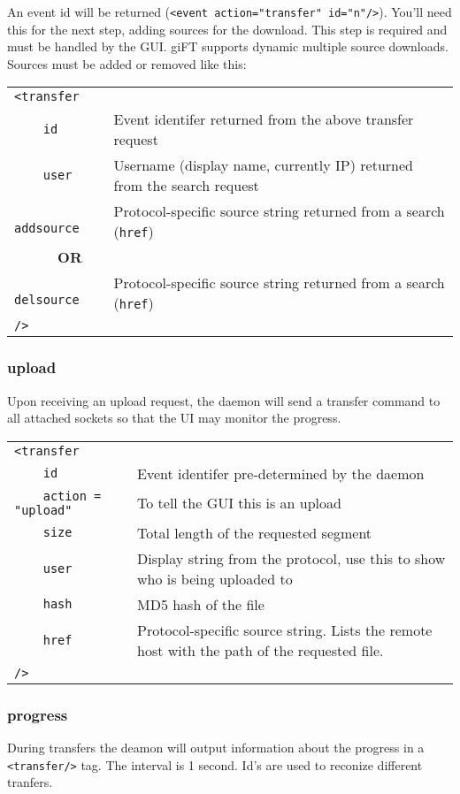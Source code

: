 \documentclass[10pt]{article}
\begin{document}
An event id will be returned (\verb|<event action="transfer" id="n"/>|). You'll
need this for the next step, adding sources for the download. This step is
required and must be handled by the GUI. giFT supports dynamic multiple source
downloads. Sources must be added or removed like this:

\begin{tabular}{p{2.6cm}p{8.5cm}}
\verb|<transfer|        &  \\
\verb|    id|           & Event identifer returned from the above transfer request \\
\verb|    user|         & Username (display name, currently IP) returned from the search request \\
\verb|    addsource|    & Protocol-specific source string returned from a search (\verb|href|) \\
\verb|      |\textbf{OR}  & \\
\verb|    delsource|    & Protocol-specific source string returned from a search (\verb|href|) \\
\verb|/>|               &
\end{tabular}

\subsubsection{upload}
Upon receiving an upload request, the daemon will send a transfer command to
all attached sockets so that the UI may monitor the progress.

\begin{tabular}{p{3.9cm}p{7.2cm}}
\verb|<transfer|    &  \\
\verb|    id|       & Event identifer pre-determined by the daemon \\
\verb|    action = "upload"| & To tell the GUI this is an upload \\
\verb|    size|     & Total length of the requested segment \\
\verb|    user|     & Display string from the protocol, use this to show who is being uploaded to \\
\verb|    hash|     & MD5 hash of the file \\
\verb|    href|     & Protocol-specific source string. Lists the remote host with the path of the requested file. \\
\verb|/>|               &
\end{tabular}

\subsubsection{progress}
During transfers the deamon will output information about the progress in a
\verb|<transfer/>| tag. The interval is 1 second. Id's are used to reconize
different tranfers.
\end{document}
